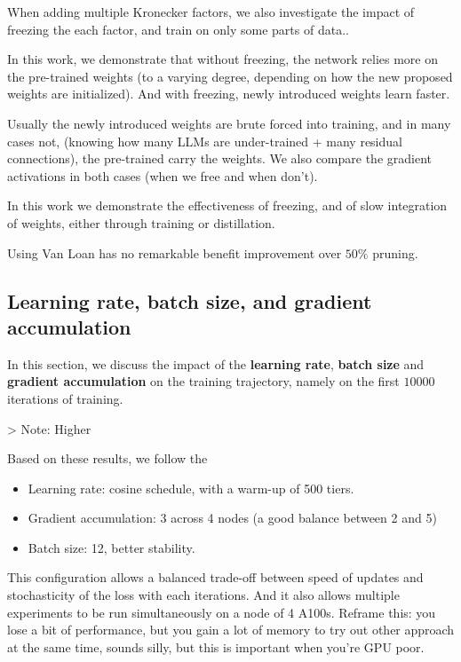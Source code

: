 \documentclass{article}
\begin{document}
When adding multiple Kronecker factors,  we also investigate the impact of freezing the each factor, and train on only some parts of data.. 

In this work, we demonstrate that without freezing, the network relies more on the pre-trained weights (to a varying degree, depending on how the new proposed weights are initialized). And with freezing, newly introduced weights learn faster.

Usually the newly introduced weights are brute forced into training, and in many cases not, (knowing how many LLMs are under-trained + many residual connections), the pre-trained carry the weights. We also compare the gradient activations in both cases (when we free and when don't).

In this work we demonstrate the effectiveness of freezing, and of slow integration of weights, either through training or distillation.

Using Van Loan has no remarkable benefit improvement over $50\%$ pruning.

\subsection{Learning rate, batch size, and gradient accumulation}%
\label{sub:lr}

In this section, we discuss the impact of the \textbf{learning rate}, \textbf{batch size} and \textbf{gradient accumulation} on the training trajectory,  namely on the first $10000$ iterations of training.


> Note: Higher


Based on these results, we follow the  
\begin{itemize}
	\item Learning rate: cosine schedule, with a warm-up of 500 tiers.
	\item Gradient accumulation: 3 across 4 nodes (a good balance between 2 and 5)
	\item Batch size: 12, better stability. 
\end{itemize}


This configuration allows a balanced trade-off between speed of updates and stochasticity of the loss with each iterations. And it also allows multiple experiments to be run simultaneously on a node of 4 A100s. Reframe this: you lose a bit of performance, but you gain a lot of memory to try out other approach at the same time, sounds silly, but this is important when you're GPU poor.
\end{document}
